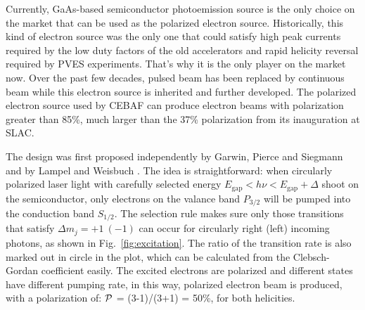 Currently, GaAs-based semiconductor photoemission source is %
the only choice on the market that can be used as the polarized electron source.
Historically, this kind of electron source was the only one that could satisfy high peak 
currents required by the low duty factors of the old accelerators and rapid helicity 
reversal required by PVES experiments. That's why it is the only player on the market now.
Over the past few decades, pulsed beam has been replaced by continuous beam while
this electron source is inherited and further developed. The polarized electron
source used by CEBAF can produce electron beams with polarization greater than
85\%, much larger than the 37\% polarization from its inauguration at SLAC. \cite{PRESCOTT1978347}

The design was first proposed independently by Garwin, Pierce and Siegmann \cite{GARWIN}
and by Lampel and Weisbuch \cite{LAMPEL1975877}. The idea is straightforward:
when circularly polarized laser light with carefully selected energy 
$E_{\text{gap}} < h\nu < E_{\text{gap}} + \Delta$
shoot on the semiconductor, only electrons on the valance band $P_{3/2}$ will be
pumped into the conduction band $S_{1/2}$. The selection rule makes sure only
those transitions that satisfy $\Delta m_j = +1 \ (-1)$ can occur for circularly
right (left) incoming photons, as shown in Fig.~\ref{fig:excitation}.
The ratio of the transition rate is also marked out in circle in the plot, 
which can be calculated from the Clebsch-Gordan coefficient easily. %
The excited electrons are polarized and different states have different pumping rate, 
in this way, polarized electron beam is produced, with a polarization of: $\mathcal{P}$ = (3-1)/(3+1) = 50\%,
for both helicities.
